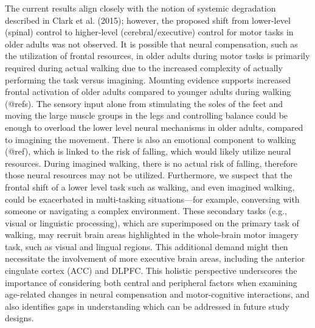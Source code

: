\documentclass[a4paper,fleqn]{cas-sc}
\begin{document}
The current results align closely with the notion of systemic degradation described in Clark et al. (2015); however, the proposed shift from lower-level (spinal) control to higher-level (cerebral/executive) control for motor tasks in older adults was not observed. It is possible that neural compensation, such as the utilization of frontal resources, in older adults during motor tasks is primarily required during actual walking due to the increased complexity of actually performing the task versus imagining. Mounting evidence supports increased frontal activation of older adults compared to younger adults during walking (@refs). The sensory input alone from stimulating the soles of the feet and moving the large muscle groups in the legs and controlling balance could be enough to overload the lower level neural mechanisms in older adults, compared to imagining the movement. There is also an emotional component to walking (@ref), which is linked to the risk of falling, which would likely utilize neural resources. During imagined walking, there is no actual risk of falling, therefore those neural resources may not be utilized. Furthermore, we suspect that the frontal shift of a lower level task such as walking, and even imagined walking, could be exacerbated in multi-tasking situations—for example, conversing with someone or navigating a complex environment. These secondary tasks (e.g., visual or linguistic processing), which are superimposed on the primary task of walking, may recruit brain areas highlighted in the whole-brain motor imagery task, such as visual and lingual regions. This additional demand might then necessitate the involvement of more executive brain areas, including the anterior cingulate cortex (ACC) and DLPFC. This holistic perspective underscores the importance of considering both central and peripheral factors when examining age-related changes in neural compensation and motor-cognitive interactions, and also identifies gaps in understanding which can be addressed in future study designs.
\end{document}
